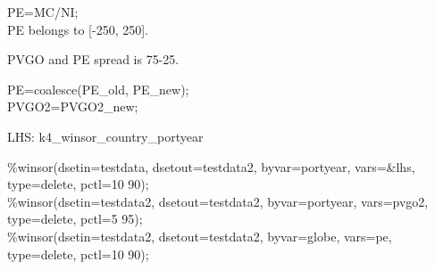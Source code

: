 

\usepackage[T1]{fontenc}




\thispagestyle{fancy}

\newcommand{\code}{\texttt}
\newcommand*{\Commonpath}{20190621}


PE=MC/NI;\\
PE belongs to [-250, 250].

PVGO and PE spread is 75-25.

PE=coalesce(PE\_old, PE\_new);\\
PVGO2=PVGO2\_new;

LHS: k4\_winsor\_country\_portyear


\%winsor(dsetin=testdata, dsetout=testdata2, byvar=portyear, vars=\&lhs, type=delete, pctl=10 90);\\
\%winsor(dsetin=testdata2, dsetout=testdata2, byvar=portyear, vars=pvgo2, type=delete, pctl=5 95);\\
\%winsor(dsetin=testdata2, dsetout=testdata2, byvar=globe, vars=pe, type=delete, pctl=10 90);\\






